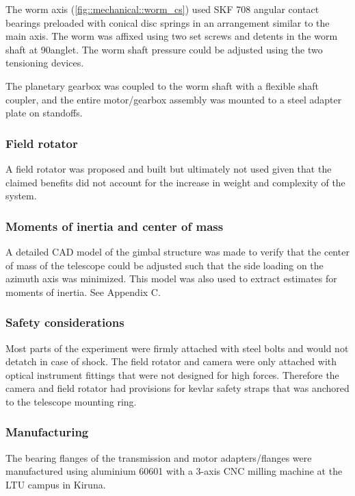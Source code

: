 The worm axis (\ref{fig::mechanical::worm_cs}) used SKF 708 angular contact bearings preloaded with conical disc springs in an arrangement similar to the main axis. The worm was affixed using two set screws and detents in the worm shaft at 90\degree anglet. The worm shaft pressure could be adjusted using the two tensioning devices. 

The planetary gearbox was coupled to the worm shaft with a flexible shaft coupler, and the entire motor/gearbox assembly was mounted to a steel adapter plate on standoffs. 

\subsubsection{Field rotator}
A field rotator was proposed and built but ultimately not used given that the claimed benefits did not account for the increase in weight and complexity of the system.


\subsubsection{Moments of inertia and center of mass}

A detailed CAD model of the gimbal structure was made to verify that the center of mass of the telescope could be adjusted such that the side loading on the azimuth axis was minimized. This model was also used to extract estimates for moments of inertia. See Appendix C.

\subsubsection{Safety considerations}

Most parts of the experiment were firmly attached with steel bolts and would not detatch in case of shock. The field rotator and camera were only attached with optical instrument fittings that were not designed for high forces. Therefore the camera and field rotator had provisions for kevlar safety straps that was anchored to the telescope mounting ring. 

\subsubsection{Manufacturing}

The bearing flanges of the transmission and motor adapters/flanges were manufactured using aluminium 60601 with a 3-axis CNC milling machine at the LTU campus in Kiruna.

